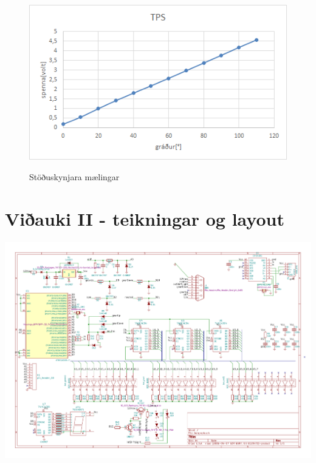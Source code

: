 \documentclass[paper=a4, fontsize=11pt]{scrartcl}
\numberwithin{equation}{section}		%
\numberwithin{figure}{section}			%
\numberwithin{table}{section}				%
\begin{document}
\begin{figure}
	\begin{center}
		\includegraphics[]{TPS.png}\\
        \caption{Stöðuskynjara mælingar}
	\end{center}
\end{figure}
\section{Viðauki II - teikningar og layout}
\includegraphics[angle=90, origin=c]{drawing.pdf} \\
\end{document}
